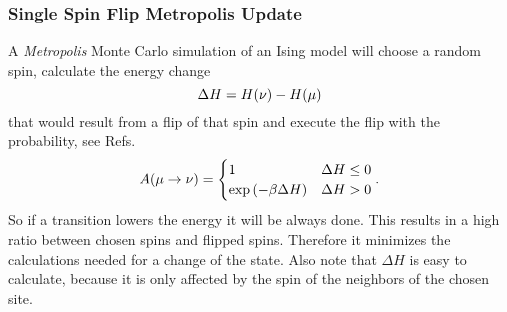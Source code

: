     \subsubsection{Single Spin Flip Metropolis Update}
        A \emph{Metropolis} Monte Carlo \cite{Metropolis1953} simulation of an
        Ising model will choose a random spin, calculate the energy change
        \begin{equation}
            \Delta H = H(\nu) - H(\mu)\\
            \label{eq:dH}
        \end{equation}
        that would result from a flip of that spin and execute the flip
        with the probability, see Refs.\ \cite{NewmanBarkema1999} \cite{Katzgraber2011}
        \begin{equation}
            A(\mu \to \nu) =
            \begin{cases}
                1                            & \Delta H \le 0 \\
                \exp{\ensuremath{\left(-\beta \Delta H\right)}} & \Delta H > 0
            \end{cases}.
            \label{eq:metropolis}
        \end{equation}
        So if a transition lowers the energy it will be always done. This
        results in a high ratio between chosen spins and flipped spins.
        Therefore it minimizes the calculations needed for a change of
        the state. Also note that \(\Delta H\) is easy to calculate,
        because it is only affected by the spin of the neighbors of the
        chosen site.

